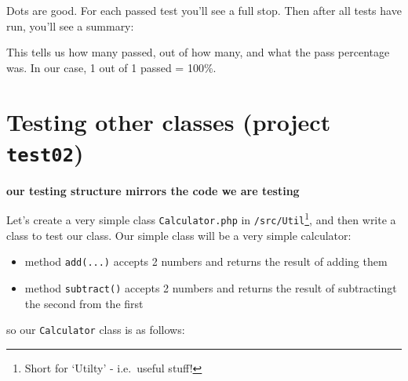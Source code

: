 \documentclass[a4paperpaper,openright]{book}
\newenvironment{Shaded}{}{}
\newcommand{\ExtensionTok}[1]{#1}
\newcommand{\KeywordTok}[1]{\textcolor[rgb]{0.00,0.44,0.13}{\textbf{#1}}}
\newcommand{\NormalTok}[1]{#1}
\newcommand{\OtherTok}[1]{\textcolor[rgb]{0.00,0.44,0.13}{#1}}
\begin{document}
Dots are good. For each passed test you'll see a full stop. Then after
all tests have run, you'll see a summary:

\begin{Shaded}
\end{Shaded}

This tells us how many passed, out of how many, and what the pass
percentage was. In our case, 1 out of 1 passed = 100\%.

\hypertarget{testing-other-classes-project-test02}{%
\section{\texorpdfstring{Testing other classes (project
\texttt{test02})}{Testing other classes (project test02)}}\label{testing-other-classes-project-test02}}

\textbf{our testing structure mirrors the code we are testing}

Let's create a very simple class \texttt{Calculator.php} in
\texttt{/src/Util}\footnote{Short for `Utilty' - i.e.~useful stuff!},
and then write a class to test our class. Our simple class will be a
very simple calculator:

\begin{itemize}
\item
  method \texttt{add(...)} accepts 2 numbers and returns the result of
  adding them
\item
  method \texttt{subtract()} accepts 2 numbers and returns the result of
  subtractingt the second from the first
\end{itemize}

so our \texttt{Calculator} class is as follows:

\begin{Shaded}
\end{Shaded}
\end{document}
